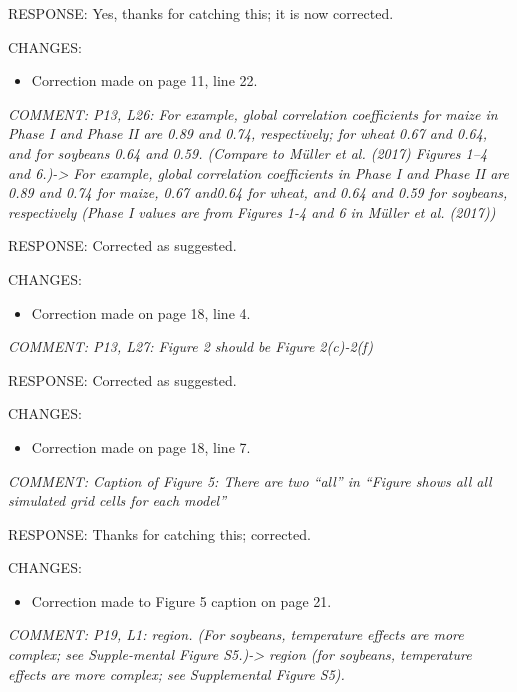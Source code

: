 \documentclass[gmd, manuscript]{copernicus} %
\begin{document}
RESPONSE: Yes, thanks for catching this; it is now corrected.
\smallskip

CHANGES:
\begin{itemize}
    \item Correction made on page 11, line 22.
\end{itemize}

\smallskip

\textcolor{dark-gray}{\textit{COMMENT: P13, L26: For example, global correlation coefficients for maize in Phase I and Phase II are 0.89 and 0.74, respectively; for wheat 0.67 and 0.64, and for soybeans 0.64 and 0.59. (Compare to Müller et al. (2017) Figures 1–4 and 6.)-> For example, global correlation coefficients in Phase I and Phase II are 0.89 and 0.74 for maize, 0.67 and0.64 for wheat, and 0.64 and 0.59 for soybeans, respectively (Phase I values are from Figures 1-4 and 6 in Müller et al. (2017))}}

RESPONSE: Corrected as suggested.
\smallskip

CHANGES:
\begin{itemize}
    \item Correction made on page 18, line 4.
\end{itemize}

\smallskip

\textcolor{dark-gray}{\textit{COMMENT: P13, L27: Figure 2 should be Figure 2(c)-2(f)}}

RESPONSE: Corrected as suggested.
\smallskip

CHANGES:
\begin{itemize}
    \item Correction made on page 18, line 7.
\end{itemize}

\smallskip

\textcolor{dark-gray}{\textit{COMMENT: Caption of Figure 5: There are two “all” in “Figure shows all all simulated grid cells for each model”}}

RESPONSE: Thanks for catching this; corrected.
\smallskip

CHANGES:
\begin{itemize}
    \item Correction made to Figure 5 caption on page 21.
\end{itemize}

\smallskip

\textcolor{dark-gray}{\textit{COMMENT: P19, L1: region. (For soybeans, temperature effects are more complex; see Supple-mental Figure S5.)-> region (for soybeans, temperature effects are more complex; see Supplemental Figure S5).}}
\end{document}
